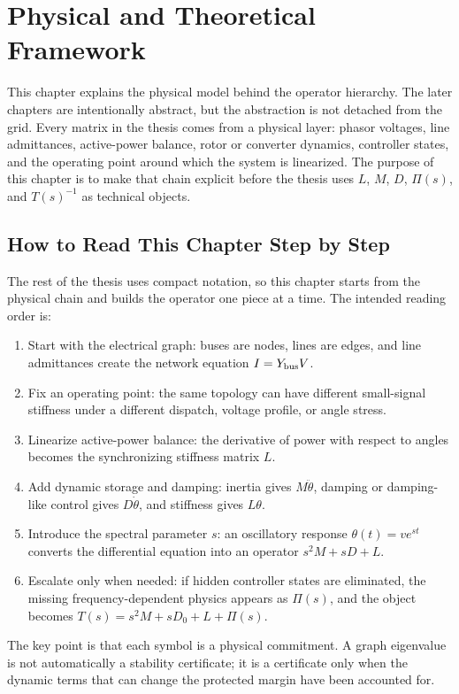 \chapter{Physical and Theoretical Framework}

This chapter explains the physical model behind the operator hierarchy. The
later chapters are intentionally abstract, but the abstraction is not detached
from the grid. Every matrix in the thesis comes from a physical layer: phasor
voltages, line admittances, active-power balance, rotor or converter dynamics,
controller states, and the operating point around which the system is
linearized. The purpose of this chapter is to make that chain explicit before
the thesis uses \(L\), \(M\), \(D\), \(\Pi(s)\), and \(T(s)^{-1}\) as technical
objects.


\section{How to Read This Chapter Step by Step}

The rest of the thesis uses compact notation, so this chapter starts from the
physical chain and builds the operator one piece at a time. The intended
reading order is:
\begin{enumerate}
\item Start with the electrical graph: buses are nodes, lines are edges, and
line admittances create the network equation \(I=Y_{\rm bus}V\).
\item Fix an operating point: the same topology can have different
small-signal stiffness under a different dispatch, voltage profile, or angle
stress.
\item Linearize active-power balance: the derivative of power with respect to
angles becomes the synchronizing stiffness matrix \(L\).
\item Add dynamic storage and damping: inertia gives \(M\ddot\theta\), damping
or damping-like control gives \(D\dot\theta\), and stiffness gives
\(L\theta\).
\item Introduce the spectral parameter \(s\): an oscillatory response
\(\theta(t)=ve^{st}\) converts the differential equation into an operator
\(s^2M+sD+L\).
\item Escalate only when needed: if hidden controller states are eliminated,
the missing frequency-dependent physics appears as \(\Pi(s)\), and the object
becomes \(T(s)=s^2M+sD_0+L+\Pi(s)\).
\end{enumerate}
The key point is that each symbol is a physical commitment. A graph eigenvalue
is not automatically a stability certificate; it is a certificate only when
the dynamic terms that can change the protected margin have been accounted for.

